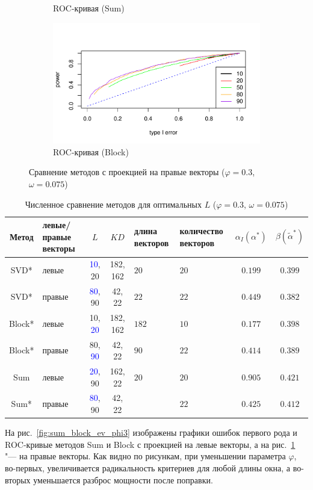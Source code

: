 \documentclass[specialist,
substylefile = spbu_report.rtx,
subf,href,colorlinks=true, 12pt]{disser}
\theoremstyle{definition}
\begin{document}
\begin{figure}[h!]
\begin{subfigure}[t]{0.5\textwidth}
		\caption{ROC-кривая (Sum)}
	\end{subfigure}\hspace{\fill}
	\begin{subfigure}[t]{0.5\textwidth}
		\centering
		\includegraphics[width=\textwidth]{img/roc_block_fa_phi3_omega0075.pdf}
		\caption{ROC-кривая (Block)}
	\end{subfigure}
	\caption{Сравнение методов с проекцией на правые векторы ($\varphi=0.3$, $\omega=0.075$)}
	\label{fig:sum_block_fa_phi3}
\end{figure}
\begin{table}[h]
	\caption{Численное сравнение методов для оптимальных $L$ ($\varphi=0.3$, $\omega=0.075$)}
	\label{tab:res_mc-ssa_phi3}
	\centering
	\begin{tabular}{|c>{\centering\arraybackslash}m{1in}cc>{\centering\arraybackslash}m{1in} >{\centering\arraybackslash}m{1in}cc|}\hline
		Метод & левые/правые векторы & $L$ & $KD$ & длина векторов & количество векторов & $\alpha_I(\alpha^*)$ & $\beta(\widetilde{\alpha}^*)$ \\
		\hline
		SVD* & левые & \textcolor{blue}{10}, 20 & 182, 162 & $20$ & $20$ & $0.199$ & $\mathbf{0.399}$ \\
		\hline
		SVD* & правые & \textcolor{blue}{80}, 90 & 42, 22  & $22$ & $22$ & $0.449$ & $0.382$ \\
		\hline
		Block* & левые & 10, \textcolor{blue}{20} & 182, 162 & $182$ & $10$ & $0.177$ & $\mathbf{0.398}$ \\
		\hline
		Block* & правые & 80, \textcolor{blue}{90} & 42, 22 & $90$ & $22$ & $0.414$ & $0.389$\\
		\hline
		Sum & левые & \textcolor{blue}{20}, 90 & 162, 22 & $20$ & $20$ & $0.905$ & $\mathbf{0.421}$ \\
		\hline
		Sum* & правые & \textcolor{blue}{80}, 90 & 42, 22 & 22 & $22$ & $0.425$ & $\mathbf{0.412}$ \\
		\hline
	\end{tabular}
\end{table}
На рис.~\ref{fig:sum_block_ev_phi3} изображены графики ошибок первого рода и ROC-кривые методов Sum и Block с проекцией на левые векторы, а на рис.~\ref{fig:sum_block_fa_phi3} "--- на правые векторы. Как видно по рисункам, при уменьшении параметра $\varphi$, во-первых, увеличивается радикальность критериев для любой длины окна, а во-вторых уменьшается разброс мощности после поправки.
\end{document}
